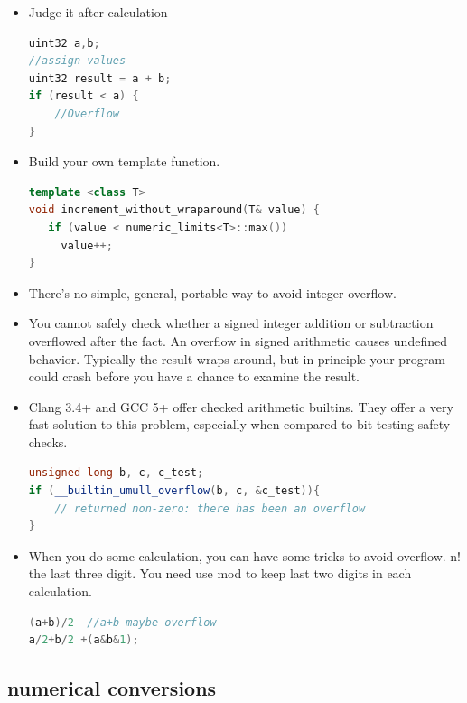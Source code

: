 \documentclass[a4paper,12pt,twoside]{book}
\begin{document}
\begin{itemize}
\item Judge it after calculation
\begin{lstlisting}[frame=single, language=c++]
uint32 a,b;
//assign values
uint32 result = a + b;
if (result < a) {
    //Overflow
}
\end{lstlisting}

\item Build your own template function.
\begin{lstlisting}[frame=single, language=c++]
template <class T>
void increment_without_wraparound(T& value) {
   if (value < numeric_limits<T>::max())
     value++;
}
\end{lstlisting}

\item There's no simple, general, portable way to avoid integer overflow.
\item You cannot safely check whether a signed integer addition or subtraction overflowed after the fact. An overflow in signed arithmetic causes undefined behavior. Typically the result wraps around, but in principle your program could crash before you have a chance to examine the result.

\item Clang 3.4+ and GCC 5+ offer checked arithmetic builtins. They offer a very fast solution to this problem, especially when compared to bit-testing safety checks.
\begin{lstlisting}[frame=single, language=c++]
unsigned long b, c, c_test;
if (__builtin_umull_overflow(b, c, &c_test)){
    // returned non-zero: there has been an overflow
}
\end{lstlisting}

\item When you do some calculation, you can have some tricks to avoid overflow. n! the last three digit. You need use mod to keep last two digits in each calculation.
\begin{lstlisting}[frame=single, language=c++]
(a+b)/2  //a+b maybe overflow
a/2+b/2 +(a&b&1);
\end{lstlisting}

\end{itemize}


\subsection{numerical conversions}
\end{document}
